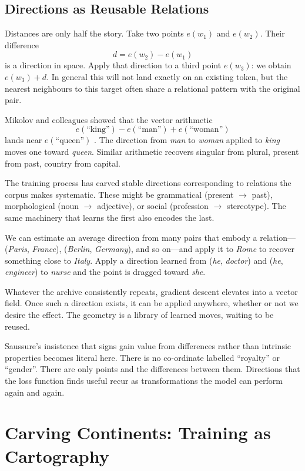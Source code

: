 \documentclass[12pt,a4paper]{article}
\begin{document}
\subsection{Directions as Reusable Relations}

Distances are only half the story. Take two points $e(w_1)$ and $e(w_2)$. Their difference
\[
d = e(w_2) - e(w_1)
\]
is a direction in space. Apply that direction to a third point $e(w_3)$: we obtain $e(w_3) + d$. In general this will not land exactly on an existing token, but the nearest neighbours to this target often share a relational pattern with the original pair.

Mikolov and colleagues showed that the vector arithmetic
\[
e(\text{``king''}) - e(\text{``man''}) + e(\text{``woman''})
\]
lands near $e(\text{``queen''})$ \cite{mikolov2013efficient}. The direction from \emph{man} to \emph{woman} applied to \emph{king} moves one toward \emph{queen}. Similar arithmetic recovers singular from plural, present from past, country from capital.

The training process has carved stable directions corresponding to relations the corpus makes systematic. These might be grammatical (present $\rightarrow$ past), morphological (noun $\rightarrow$ adjective), or social (profession $\rightarrow$ stereotype). The same machinery that learns the first also encodes the last.

We can estimate an average direction from many pairs that embody a relation---(\emph{Paris}, \emph{France}), (\emph{Berlin}, \emph{Germany}), and so on---and apply it to \emph{Rome} to recover something close to \emph{Italy}. Apply a direction learned from (\emph{he}, \emph{doctor}) and (\emph{he}, \emph{engineer}) to \emph{nurse} and the point is dragged toward \emph{she}.

Whatever the archive consistently repeats, gradient descent elevates into a vector field. Once such a direction exists, it can be applied anywhere, whether or not we desire the effect. The geometry is a library of learned moves, waiting to be reused.

Saussure's insistence that signs gain value from differences rather than intrinsic properties becomes literal here. There is no co-ordinate labelled ``royalty'' or ``gender''. There are only points and the differences between them. Directions that the loss function finds useful recur as transformations the model can perform again and again.

\section{Carving Continents: Training as Cartography}
\end{document}
